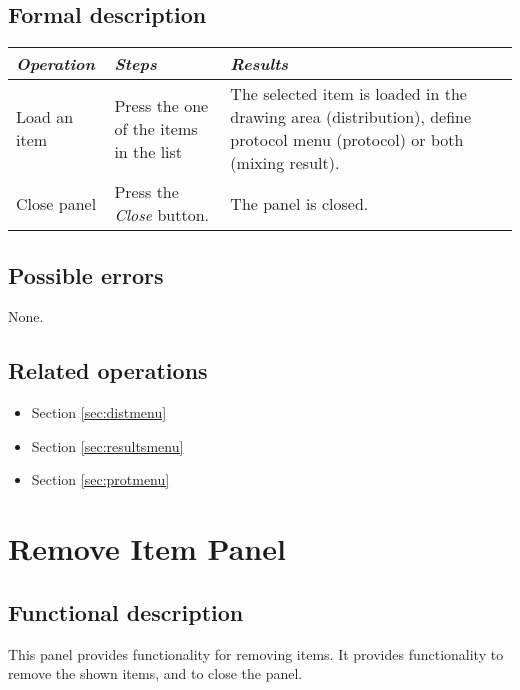   \subsection*{Formal description}
    \begin{tabularx}{\textwidth}{XXX}
    \toprule
    \emph{Operation} & \emph{Steps} & \emph{Results} \\
    \midrule
    Load an item & Press the one of the items in the list & The selected item is loaded in the drawing area (distribution), define protocol menu (protocol) or both (mixing result). \\
    \midrule
    Close panel & Press the \emph{Close} button. & The panel is closed. \\
    \bottomrule
\end{tabularx}

  \subsection*{Possible errors}
  None.

  \subsection*{Related operations}
   \begin{itemize}
   \item Section \ref{sec:distmenu}
   \item Section \ref{sec:resultsmenu}
   \item Section \ref{sec:protmenu}
  \end{itemize}

\section{Remove Item Panel}
\label{sec:removeitem}
  \subsection*{Functional description}
  This panel provides functionality for removing items. It provides functionality to remove the shown items, and to close the panel.

